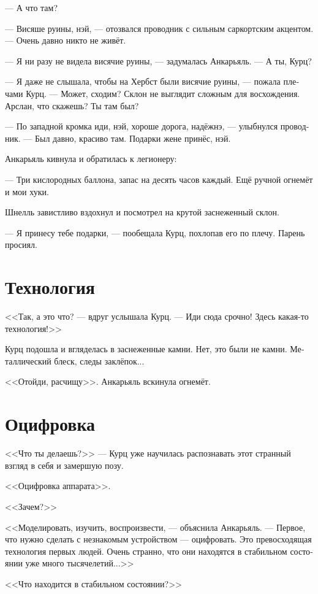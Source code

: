 \documentclass[a4paper,10pt,fleqn]{book}\usepackage{polyglossia}\setdefaultlanguage[babelshorthands=true]{russian}\setotherlanguage{english}\defaultfontfeatures{Ligatures=TeX,Mapping=tex-text}\usepackage{xcolor}\newcommand{\ml}[3]{#2}
\begin{document}
--- А что там?

--- Висяше руины, нэй, --- отозвался проводник с сильным саркортским акцентом.
--- Очень давно никто не живёт.

--- Я ни разу не видела висячие руины, --- задумалась Анкарьяль.
--- А ты, Курц?

--- Я даже не слышала, чтобы на Хербст были висячие руины, --- пожала плечами Курц.
--- Может, сходим?
Склон не выглядит сложным для восхождения.
Арслан, что скажешь?
Ты там был?

--- По западной кромка иди, нэй, хороше дорога, надёжнэ, --- улыбнулся проводник.
--- Был давно, красиво там.
Подарки жене принёс, нэй.

Анкарьяль кивнула и обратилась к легионеру:

--- Три кислородных баллона, запас на десять часов каждый.
Ещё ручной огнемёт и мои хуки.

Шнелль завистливо вздохнул и посмотрел на крутой заснеженный склон.

--- Я принесу тебе подарки, --- пообещала Курц, похлопав его по плечу.
Парень просиял.

\section{Технология}

<<Так, а это что? --- вдруг услышала Курц.
--- Иди сюда срочно!
Здесь какая-то технология!>>

Курц подошла и вгляделась в заснеженные камни.
Нет, это были не камни.
Металлический блеск, следы заклёпок...

<<Отойди, расчищу>>.
Анкарьяль вскинула огнемёт.

\section{Оцифровка}

<<Что ты делаешь?>> --- Курц уже научилась распознавать этот странный взгляд в себя и замершую позу.

<<Оцифровка аппарата>>.

<<Зачем?>>

<<Моделировать, изучить, воспроизвести, --- объяснила Анкарьяль.
--- Первое, что нужно сделать с незнакомым устройством --- оцифровать.
Это превосходящая технология первых людей.
Очень странно, что они находятся в стабильном состоянии уже много тысячелетий...>>

<<Что находится в стабильном состоянии?>>
\end{document}
